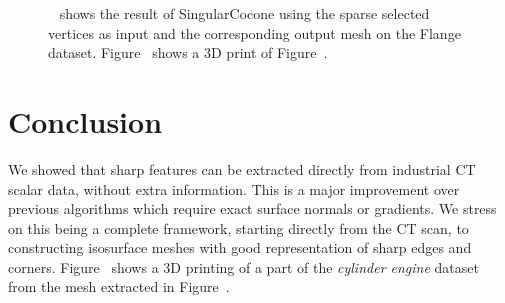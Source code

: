  \begin{figure}[htb]
     \centering
     \caption{ ~\protect{} shows the result of SingularCocone using the sparse selected vertices as input and the corresponding output mesh on the Flange dataset.
          Figure~\protect{} shows a 3D print of Figure~\protect{}.
}
     \label{fig:fandisk}
    \end{figure}
    
\section{Conclusion}

We showed that sharp features can be extracted directly 
from industrial CT scalar data, without extra information.
This is a major improvement over previous algorithms which require
exact surface normals or gradients.
We stress on this being a complete framework, starting directly from the CT scan, to constructing isosurface meshes with good representation of sharp edges and corners. 
Figure~ shows a 3D printing of a part of the \emph{cylinder engine} dataset from the  mesh extracted in Figure~.
